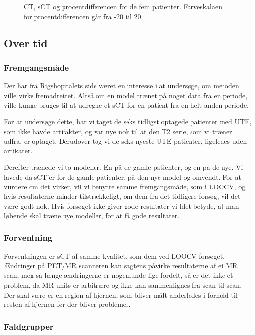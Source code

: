 \begin{figure}
\begin{subfigure}[b]{0.3\textwidth}
        \label{col:loocv_pet_pat5_pd}
    \end{subfigure}
    \caption{CT, sCT og procentdifferencen for de fem patienter. Farveskalaen for procentdifferencen går fra -20 til 20.}
    \label{col:loocv_pet}
\end{figure}

\subsection{Over tid}
\subsubsection{Fremgangsmåde}

Der har fra Rigshopitalets side været en interesse i at undersøge, om
metoden ville virke fremadrettet. Altså om en model trænet på noget data
fra en periode, ville kunne bruges til at udregne et sCT for en patient
fra en helt anden periode. 

For at undersøge dette, har vi taget de seks
tidligst optagede patienter med UTE, som ikke havde artifakter, og
var nye nok til at den T2 serie, som vi træner udfra, er optaget.
Derudover tog vi de seks nyeste UTE patienter, ligeledes uden artikater.


Derefter trænede vi to modeller. En på de gamle patienter, og en på de
nye. Vi lavede da sCT'er for de gamle patienter, på den nye model og
omvendt. For at vurdere om det virker, vil vi benytte samme fremgangsmåde,
som i LOOCV, og hvis resultaterne minder tilstrækkeligt, om dem fra det
tidligere forsøg, vil det være godt nok. Hvis forsøget ikke giver gode
resultater vi ldet betyde, at man løbende skal træne nye modeller, for at
få gode resultater.

\subsubsection{Forventning}

Forventningen er sCT af samme kvalitet, som dem ved LOOCV-forsøget.
Ændringer på PET/MR scanneren kan sagtens påvirke resultaterne af et MR
scan, men så længe ændringerne er nogenlunde lige fordelt, så er det ikke
et problem, da MR-units er arbitrære og ikke kan sammenlignes fra scan til
scan. Der skal være er en region af hjernen, som bliver målt anderledes i
forhold til resten af hjernen før der bliver problemer.

\subsubsection{Faldgrupper}


